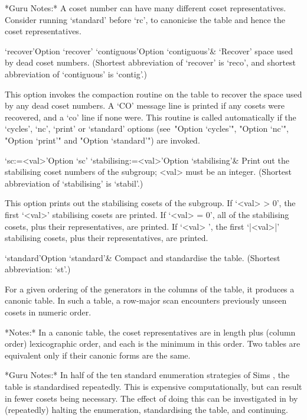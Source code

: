 *Guru Notes:*
A coset number can have many different coset representatives. Consider
running `standard' before `rc', to canonicise the table and hence  the
coset representatives.

\>`recover'{Option `recover'}
\>`contiguous'{Option `contiguous'}&
`Recover' space used by dead coset numbers.
(Shortest  abbreviation  of  `recover'   is   `reco',   and   shortest
abbreviation of `contiguous' is `contig'.)

This option invokes the compaction routine on the table to recover the
space used by any dead coset numbers. A `CO' message line  is  printed
if any cosets were recovered, and a  `co'  line  if  none  were.  This
routine is called automatically if  the  `cycles',  `nc',  `print'  or
`standard' options  (see~"Option  `cycles'",  "Option  `nc'",  "Option
`print'" and "Option `standard'") are invoked.

\>`sc:=<val>'{Option `sc'}
\>`stabilising:=<val>'{Option `stabilising'}&
Print out the stabilising coset numbers of the subgroup; <val> must be
an integer. (Shortest abbreviation of `stabilising' is `stabil'.)

This option prints out the stabilising  cosets  of  the  subgroup.  If
`<val> > 0', the first `<val>'  stabilising  cosets  are  printed.  If
`<val>  =  0',   all   of   the   stabilising   cosets,   plus   their
representatives, are printed. If `<val> ',  the  first  `|<val>|'
stabilising cosets, plus their representatives, are printed.

\>`standard'{Option `standard'}&
Compact and standardise the table. (Shortest abbreviation: `st'.)

For a given ordering of the generators in the columns of the table, it
produces a canonic table. In such a table, a row-major scan encounters
previously unseen cosets in numeric order.

*Notes:*
In a canonic table, the  coset  representatives  are  in  length  plus
(column order) lexicographic order, and each is the  minimum  in  this
order. Two tables are equivalent only if their canonic forms  are  the
same.

*Guru Notes:*
In  half  of  the  ten  standard  enumeration   strategies   of   Sims
\cite{Sim94}, the table is standardised repeatedly. This is  expensive
computationally, but can result in fewer cosets being  necessary.  The
effect of doing this can be investigated  in  {\ACE}  by  (repeatedly)
halting the enumeration, standardising the table, and continuing.

